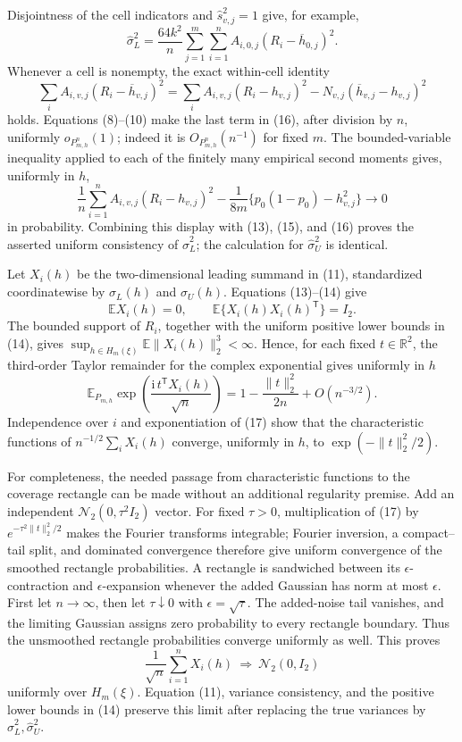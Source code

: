 Disjointness of the cell indicators and \(\widehat s_{v,j}^2=1\) give, for example,
\[
 \widehat\sigma_L^2
 =\frac{64k^2}{n}\sum_{j=1}^{m}\sum_{i=1}^{n}
 A_{i,0,j}(R_i-\overline h_{0,j})^2.                                    \tag{15}
\]
Whenever a cell is nonempty, the exact within-cell identity
\[
 \sum_iA_{i,v,j}(R_i-\overline h_{v,j})^2
 =\sum_iA_{i,v,j}(R_i-h_{v,j})^2
 -N_{v,j}(\overline h_{v,j}-h_{v,j})^2                                  \tag{16}
\]
holds. Equations (8)--(10) make the last term in (16), after division by \(n\), uniformly \(o_{P_{m,h}^{n}}(1)\); indeed it is \(O_{P_{m,h}^{n}}(n^{-1})\) for fixed \(m\). The bounded-variable inequality applied to each of the finitely many empirical second moments gives, uniformly in \(h\),
\[
 \frac1n\sum_{i=1}^{n}A_{i,v,j}(R_i-h_{v,j})^2
 -\frac1{8m}\{p_0(1-p_0)-h_{v,j}^2\}
 \longrightarrow0
\]
in probability. Combining this display with (13), (15), and (16) proves the asserted uniform consistency of \(\widehat\sigma_L^2\); the calculation for \(\widehat\sigma_U^2\) is identical.

Let \(X_i(h)\) be the two-dimensional leading summand in (11), standardized coordinatewise by \(\sigma_L(h)\) and \(\sigma_U(h)\). Equations (13)--(14) give
\[
 \mathbb E X_i(h)=0,
 \qquad \mathbb E\{X_i(h)X_i(h)^{\mathsf T}\}=I_2.
\]
The bounded support of \(R_i\), together with the uniform positive lower bounds in (14), gives \(\sup_{h\in H_m(\xi)}\mathbb E\|X_i(h)\|_2^3<\infty\). Hence, for each fixed \(t\in\mathbb R^2\), the third-order Taylor remainder for the complex exponential gives uniformly in \(h\)
\[
 \mathbb E_{P_{m,h}}\exp\left(\frac{\mathrm i\,t^{\mathsf T}X_i(h)}{\sqrt n}\right)
 =1-\frac{\|t\|_2^2}{2n}+O(n^{-3/2}).                                  \tag{17}
\]
Independence over \(i\) and exponentiation of (17) show that the characteristic functions of \(n^{-1/2}\sum_iX_i(h)\) converge, uniformly in \(h\), to \(\exp(-\|t\|_2^2/2)\).

For completeness, the needed passage from characteristic functions to the coverage rectangle can be made without an additional regularity premise. Add an independent \(\mathcal N_2(0,\tau^2I_2)\) vector. For fixed \(\tau>0\), multiplication of (17) by \(e^{-\tau^2\|t\|_2^2/2}\) makes the Fourier transforms integrable; Fourier inversion, a compact--tail split, and dominated convergence therefore give uniform convergence of the smoothed rectangle probabilities. A rectangle is sandwiched between its \(\epsilon\)-contraction and \(\epsilon\)-expansion whenever the added Gaussian has norm at most \(\epsilon\). First let \(n\to\infty\), then let \(\tau\downarrow0\) with \(\epsilon=\sqrt\tau\). The added-noise tail vanishes, and the limiting Gaussian assigns zero probability to every rectangle boundary. Thus the unsmoothed rectangle probabilities converge uniformly as well. This proves
\[
 \frac1{\sqrt n}\sum_{i=1}^{n}X_i(h)\ \Longrightarrow\ \mathcal N_2(0,I_2)
\]
uniformly over \(H_m(\xi)\). Equation (11), variance consistency, and the positive lower bounds in (14) preserve this limit after replacing the true variances by \(\widehat\sigma_L^2,\widehat\sigma_U^2\).


